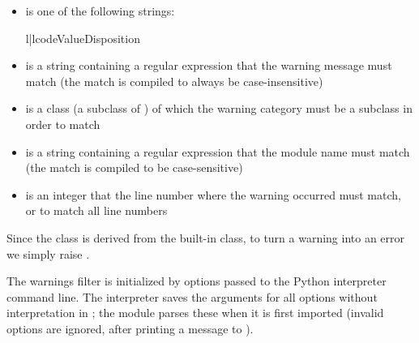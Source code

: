 \begin{itemize}

\item {} is one of the following strings:

    \begin{tableii}{l|l}{code}{Value}{Disposition}







    \end{tableii}

\item {} is a string containing a regular expression that
the warning message must match (the match is compiled to always be 
case-insensitive) 

\item {} is a class (a subclass of ) of
      which the warning category must be a subclass in order to match

\item {} is a string containing a regular expression that the module
      name must match (the match is compiled to be case-sensitive)

\item {} is an integer that the line number where the
      warning occurred must match, or  to match all line
      numbers

\end{itemize}

Since the  class is derived from the built-in
 class, to turn a warning into an error we simply
raise .

The warnings filter is initialized by  options passed
to the Python interpreter command line.  The interpreter saves the
arguments for all  options without interpretation in
; the  module parses these when
it is first imported (invalid options are ignored, after printing a
message to ).


